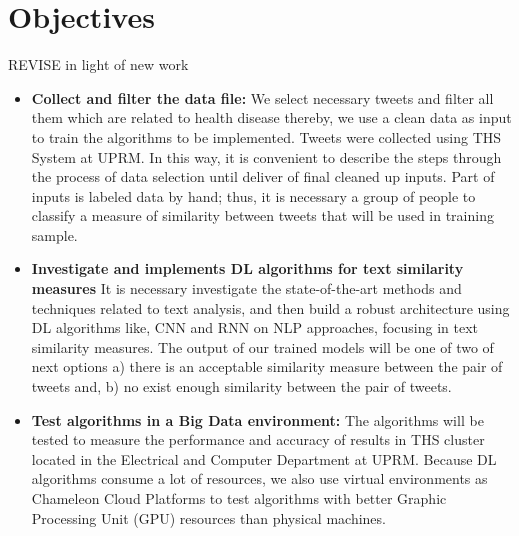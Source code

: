 \documentclass[12pt]{report}
\begin{document}
\section{Objectives}
REVISE in light of new work
\begin{itemize}[nolistsep]
	\item \textbf{Collect and filter the data file: } We select necessary tweets and filter all them which are related to health disease thereby, we use a clean data as input to train the algorithms to be implemented. Tweets were collected using \ac{THS} System at \ac{UPRM}. In this way, it is convenient to describe the steps through the process of data selection until deliver of final cleaned up inputs. Part of inputs is labeled data by hand; thus, it is necessary a group of people to classify a measure of similarity between tweets that will be used in training sample.
	\item \textbf{Investigate and implements \ac{DL} algorithms for text similarity measures} It is necessary investigate the state-of-the-art methods and techniques related to text analysis, and then build a robust architecture using \ac{DL} algorithms like, \ac{CNN} and \ac{RNN} on \ac{NLP} approaches,  focusing in text similarity measures. The output of our trained models will be one of two of next options a) there is an acceptable similarity measure between the pair of tweets and, b) no exist enough similarity between the pair of tweets.
	\item \textbf{Test algorithms in a Big Data environment: } The algorithms will be tested to measure the performance and accuracy of results in \ac{THS} cluster located in the Electrical and Computer Department at \ac{UPRM}. Because \ac{DL} algorithms consume a lot of resources, we also use virtual environments as Chameleon Cloud Platforms to test algorithms with better Graphic Processing Unit (GPU) resources than physical machines.
\end{itemize}
\end{document}
